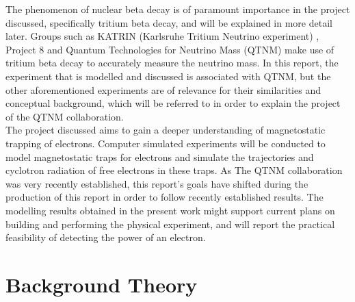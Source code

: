 \documentclass[a4paper,12pt, notitlepage]{article}
\begin{document}
The phenomenon of nuclear beta decay is of paramount importance in the project discussed, specifically tritium beta decay, and will be explained in more detail later. Groups such as KATRIN (Karlsruhe Tritium Neutrino experiment) \cite{Arenz2016}, Project 8 \cite{Project82017} and Quantum Technologies for Neutrino Mass (QTNM) make use of tritium beta decay to accurately measure the neutrino mass. In this report, the experiment that is modelled and discussed is associated with QTNM, but the other aforementioned experiments are of relevance for their similarities and conceptual background, which will be referred to in order to explain the project of the QTNM collaboration. 
\\
\indent The project discussed aims to gain a deeper understanding of magnetostatic trapping of electrons. Computer simulated experiments will be conducted to model magnetostatic traps for electrons and simulate the trajectories and cyclotron radiation of free electrons in these traps. As The QTNM collaboration was very recently established, this report's goals have shifted during the production of this report in order to follow recently established results. The modelling results obtained in the present work might support current plans on building and performing the physical experiment, and will report the practical feasibility of detecting the power of an electron.
\section{Background Theory}
\end{document}
